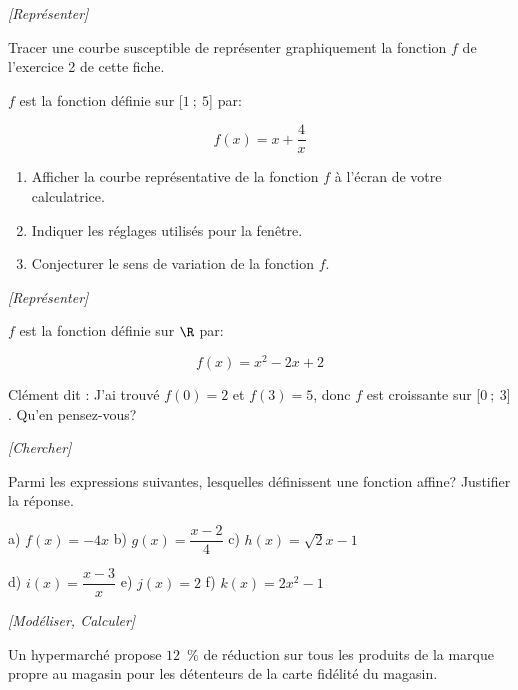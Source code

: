 \exo \textit{[Représenter]}

Tracer une courbe susceptible de représenter graphiquement la fonction $f$ de l'exercice 2 de cette fiche.

\exo

$f$ est la fonction définie sur [$1~;~5$] par:

\[f(x)=x+\dfrac{4}{x}\]

\begin{enumerate}
\item Afficher la courbe représentative de la fonction $f$ à l'écran de votre calculatrice.
\item Indiquer les réglages utilisés pour la fenêtre.
\item Conjecturer le sens de variation de la fonction $f$.
\end{enumerate}

\exo \textit{[Représenter]}

$f$ est la fonction définie sur $\R$ par:

\[f(x)=x^2-2x+2\]

Clément dit : \og J'ai trouvé $f(0)=2$ et $f(3)=5$, donc $f$ est croissante sur [$0~;~3$] \fg{} . Qu'en pensez-vous?

\exo \textit{[Chercher]}

Parmi les expressions suivantes, lesquelles définissent une fonction affine? Justifier la réponse.

a) $f(x)=-4x$ \hspace{0.9 cm} b) $g(x)=\dfrac{x-2}{4}$ \hspace{0.8 cm} c) $h(x)=\sqrt{2}x-1$ 

d) $i(x)=\dfrac{x-3}{x}$ \hspace{0.8 cm} e) $j(x)=2$ \hspace{1.6 cm} f) $k(x)=2x^2-1$ 

\exo \textit{[Modéliser, Calculer]}

Un hypermarché propose $12$~\% de réduction sur tous les produits de la marque propre au magasin pour les détenteurs de la carte fidélité du magasin. 

